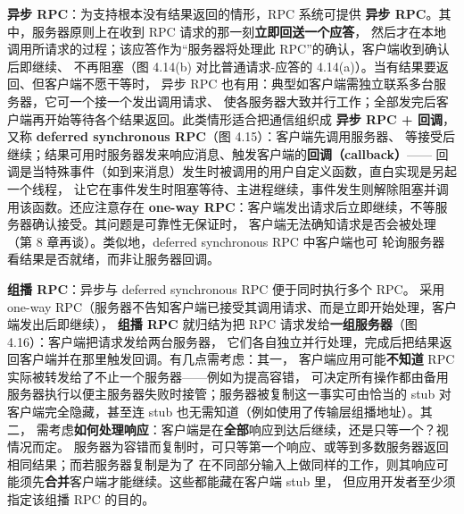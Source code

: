 \medskip\noindent\textbf{异步 RPC}：为支持根本没有结果返回的情形，RPC 系统可提供
\textbf{异步 RPC}。其中，服务器原则上在收到 RPC 请求的那一刻\textbf{立即回送一个应答}，
然后才在本地调用所请求的过程；该应答作为“服务器将处理此 RPC”的确认，客户端收到确认后即继续、
不再阻塞（图 4.14(b) 对比普通请求-应答的 4.14(a)）。当有结果要返回、但客户端不愿干等时，
异步 RPC 也有用：典型如客户端需独立联系多台服务器，它可一个接一个发出调用请求、
使各服务器大致并行工作；全部发完后客户端再开始等待各个结果返回。此类情形适合把通信组织成
\textbf{异步 RPC + 回调}，又称 \textbf{deferred synchronous RPC}（图 4.15）：客户端先调用服务器、
等接受后继续；结果可用时服务器发来响应消息、触发客户端的\textbf{回调（callback）}——
回调是当特殊事件（如到来消息）发生时被调用的用户自定义函数，直白实现是另起一个线程，
让它在事件发生时阻塞等待、主进程继续，事件发生则解除阻塞并调用该函数。还应注意存在
\textbf{one-way RPC}：客户端发出请求后立即继续，不等服务器确认接受。其问题是可靠性无保证时，
客户端无法确知请求是否会被处理（第 8 章再谈）。类似地，deferred synchronous RPC 中客户端也可
轮询服务器看结果是否就绪，而非让服务器回调。

\medskip\noindent\textbf{组播 RPC}：异步与 deferred synchronous RPC 便于同时执行多个 RPC。
采用 one-way RPC（服务器不告知客户端已接受其调用请求、而是立即开始处理，客户端发出后即继续），
\textbf{组播 RPC} 就归结为把 RPC 请求发给\textbf{一组服务器}（图 4.16）：客户端把请求发给两台服务器，
它们各自独立并行处理，完成后把结果返回客户端并在那里触发回调。有几点需考虑：其一，
客户端应用可能\textbf{不知道} RPC 实际被转发给了不止一个服务器——例如为提高容错，
可决定所有操作都由备用服务器执行以便主服务器失败时接管；服务器被复制这一事实可由恰当的 stub
对客户端完全隐藏，甚至连 stub 也无需知道（例如使用了传输层组播地址）。其二，
需考虑\textbf{如何处理响应}：客户端是在\textbf{全部}响应到达后继续，还是只等一个？视情况而定。
服务器为容错而复制时，可只等第一个响应、或等到多数服务器返回相同结果；而若服务器复制是为了
在不同部分输入上做同样的工作，则其响应可能须先\textbf{合并}客户端才能继续。这些都能藏在客户端 stub 里，
但应用开发者至少须指定该组播 RPC 的目的。

\begin{closeread}
\end{closeread}

